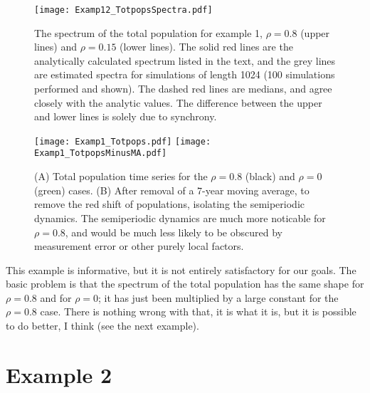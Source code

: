 \documentclass[letterpaper,11pt]{article}
\begin{document}
\begin{figure}
\texttt{[image: Examp12\_TotpopsSpectra.pdf]}
\caption{The spectrum of the total population for example 1, $\rho=0.8$ (upper lines) and $\rho=0.15$ (lower lines). The solid red lines are the analytically calculated spectrum listed in the text, and the grey lines are estimated spectra for simulations of length 1024 (100 simulations performed and shown). The dashed red lines are medians, and 
agree closely with the analytic values. The difference between the upper and lower lines is solely due to synchrony.}\label{fig:Stotexample1}
\end{figure}

\begin{figure}
\texttt{[image: Examp1\_Totpops.pdf]}
\texttt{[image: Examp1\_TotpopsMinusMA.pdf]}
\caption{(A) Total population time series for the $\rho=0.8$ (black) and
$\rho=0$ (green) cases. (B) After removal of a $7$-year moving average,
to remove the red shift of populations, isolating the semiperiodic dynamics.
The semiperiodic dynamics are much more noticable for $\rho=0.8$, and would
be much less likely to be obscured by measurement error or other purely local
factors.}
\label{fig:totpopstretches}
\end{figure}

This example is informative, but it is not entirely satisfactory for our goals.
The basic problem is that the spectrum of the total population has the same shape
for $\rho=0.8$ and for $\rho=0$; it has just been multiplied by a large constant 
for the $\rho=0.8$ case. There is nothing wrong with that, it is what it is, but it
is possible to do better, I think (see the next example).
 
\section{Example 2}
\end{document}
